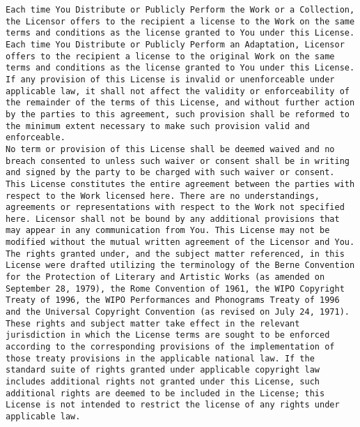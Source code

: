 \documentclass[10pt,A4]{book}
\begin{document}
\begin{verbatim}
Each time You Distribute or Publicly Perform the Work or a Collection, the Licensor offers to the recipient a license to the Work on the same terms and conditions as the license granted to You under this License.
Each time You Distribute or Publicly Perform an Adaptation, Licensor offers to the recipient a license to the original Work on the same terms and conditions as the license granted to You under this License.
If any provision of this License is invalid or unenforceable under applicable law, it shall not affect the validity or enforceability of the remainder of the terms of this License, and without further action by the parties to this agreement, such provision shall be reformed to the minimum extent necessary to make such provision valid and enforceable.
No term or provision of this License shall be deemed waived and no breach consented to unless such waiver or consent shall be in writing and signed by the party to be charged with such waiver or consent.
This License constitutes the entire agreement between the parties with respect to the Work licensed here. There are no understandings, agreements or representations with respect to the Work not specified here. Licensor shall not be bound by any additional provisions that may appear in any communication from You. This License may not be modified without the mutual written agreement of the Licensor and You.
The rights granted under, and the subject matter referenced, in this License were drafted utilizing the terminology of the Berne Convention for the Protection of Literary and Artistic Works (as amended on September 28, 1979), the Rome Convention of 1961, the WIPO Copyright Treaty of 1996, the WIPO Performances and Phonograms Treaty of 1996 and the Universal Copyright Convention (as revised on July 24, 1971). These rights and subject matter take effect in the relevant jurisdiction in which the License terms are sought to be enforced according to the corresponding provisions of the implementation of those treaty provisions in the applicable national law. If the standard suite of rights granted under applicable copyright law includes additional rights not granted under this License, such additional rights are deemed to be included in the License; this License is not intended to restrict the license of any rights under applicable law.
\end{verbatim}
\end{document}
